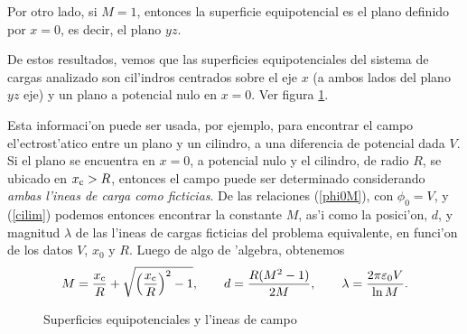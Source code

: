 Por otro lado, si $M=1$, entonces la superficie equipotencial es el plano
definido por $x=0$, es decir, el plano $yz$.

De estos resultados, vemos que las superficies equipotenciales del sistema de
cargas analizado son cil'indros centrados sobre el eje $x$ (a ambos lados del
plano $yz$ eje) y un plano a potencial nulo en $x=0$. Ver figura \ref{ci04}.
%

Esta informaci'on puede ser usada, por ejemplo, para encontrar el campo
el'ectrost'atico entre un plano y un cilindro, a una diferencia de potencial
dada $V$. Si el plano se encuentra en $x=0$, a potencial nulo y el cilindro, de
radio $R$, se ubicado en $x_{\rm c}>R$, entonces el campo puede ser determinado
considerando \textit{ambas l'ineas de carga como ficticias}. De las relaciones
(\ref{phi0M}), con $\phi_0=V$, y (\ref{cilim}) podemos entonces encontrar la
constante $M$, as'i como la posici'on, $d$, y magnitud $\lambda$ de las l'ineas
de cargas ficticias del problema equivalente, en funci'on de los datos $V$,
$x_0$ y $R$. Luego de algo de 'algebra, obtenemos
\begin{equation}
 M=\frac{x_{\rm c}}{R}+\sqrt{\left(\frac{x_{\rm c}}{R}\right)^2-1}, \qquad
d=\frac{R(M^2-1)}{2M}, \qquad \lambda=\frac{2\pi\varepsilon_0V}{\ln M}.
\end{equation}
\begin{figure}[!h]
\centerline{
\hspace{1cm}
}
\caption{Superficies equipotenciales y l'ineas de campo}
\label{ci04}
\end{figure}

